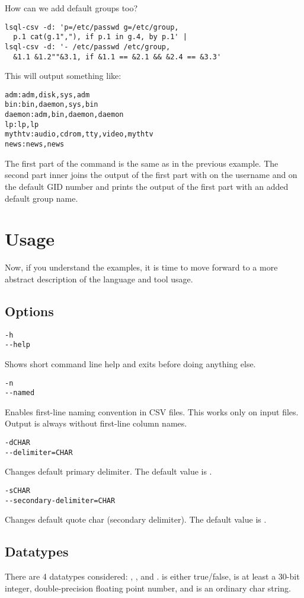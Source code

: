 How can we add default groups too?
\begin{verbatim}
lsql-csv -d: 'p=/etc/passwd g=/etc/group, 
  p.1 cat(g.1","), if p.1 in g.4, by p.1' |
lsql-csv -d: '- /etc/passwd /etc/group, 
  &1.1 &1.2""&3.1, if &1.1 == &2.1 && &2.4 == &3.3'
\end{verbatim}
This will output something like:
\begin{verbatim}
adm:adm,disk,sys,adm
bin:bin,daemon,sys,bin
daemon:adm,bin,daemon,daemon
lp:lp,lp
mythtv:audio,cdrom,tty,video,mythtv
news:news,news
\end{verbatim}

The first part of the command is the same as in the previous example. The second part inner joins the output
of the first part with  on the username and  on the default GID number and prints
the output of the first part with an added default group name.



\section{Usage}
Now, if you understand the examples, it is time to move forward to a more abstract description of the language and tool usage.

\subsection{Options}
\begin{verbatim}
-h
--help
\end{verbatim}
Shows short command line help and exits before doing anything else.

\begin{verbatim}
-n
--named
\end{verbatim}
Enables first-line naming convention in CSV files. This works only on input files. 
Output is always without first-line column names.

\begin{verbatim}
-dCHAR
--delimiter=CHAR
\end{verbatim}
Changes default primary delimiter. The default value is \icode{,}.

\begin{verbatim}
-sCHAR
--secondary-delimiter=CHAR
\end{verbatim}
Changes default quote char (secondary delimiter). The default value is .

\subsection{Datatypes}
There are 4 datatypes considered: , ,  and . 
 is either true/false,  is at least a 30-bit integer,  double-precision floating point number, and  is an ordinary char string.


